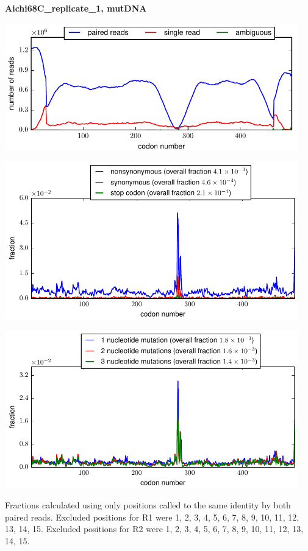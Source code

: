\documentclass[10pt,letterpaper]{article}
\begin{document}
\centerline{\Large \bf Aichi68C\_replicate\_1, mutDNA}
\vspace{0.1in}

\centerline{\includegraphics[width=5in]{Aichi68C_replicate_1_mutDNA_codondepth.pdf}}
\vspace{0.1in}

\centerline{\includegraphics[width=5in]{Aichi68C_replicate_1_mutDNA_syn-ns-dist.pdf}}
\vspace{0.1in}

\centerline{\includegraphics[width=5in]{Aichi68C_replicate_1_mutDNA_nmutspercodon-dist.pdf}}
\vspace{0.1in}

Fractions calculated using only positions called to the same identity by both paired reads.  Excluded positions for R1 were 1, 2, 3, 4, 5, 6, 7, 8, 9, 10, 11, 12, 13, 14, 15. 
 Excluded positions for R2 were 1, 2, 3, 4, 5, 6, 7, 8, 9, 10, 11, 12, 13, 14, 15. 
\end{document}
